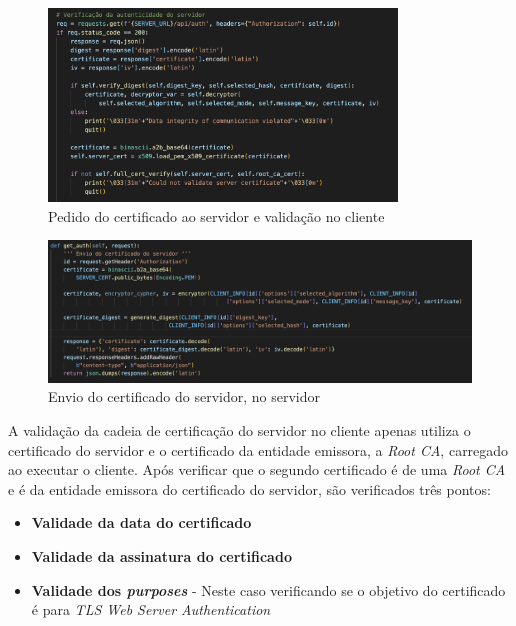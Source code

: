 \documentclass[10pt,english]{article}
\begin{document}
\begin{figure}[!h]
        \centering
        \includegraphics[width=350]{images/server_auth_1_client.png}
        \caption{Pedido do certificado ao servidor e validação no cliente}
\end{figure}

\clearpage

\begin{figure}[!h]
        \centering
        \includegraphics[width=\textwidth]{images/get_auth_server.png}
        \caption{Envio do certificado do servidor, no servidor}
\end{figure}

\par A validação da cadeia de certificação do servidor no cliente apenas utiliza o certificado do servidor e o certificado da entidade emissora, a \textit{Root CA}, carregado ao executar o cliente. Após verificar que o segundo certificado é de uma \textit{Root CA} e é da entidade emissora do certificado do servidor, são verificados três pontos:

\begin{itemize}
    \item \textbf{Validade da data do certificado}
    \item \textbf{Validade da assinatura do certificado}
    \item \textbf{Validade dos \textit{purposes}} - Neste caso verificando se o objetivo do certificado é para \textit{TLS Web Server Authentication}
\end{itemize}
\end{document}
